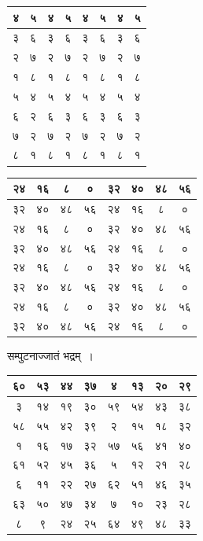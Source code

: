 \documentclass[11pt, openany]{book}
\begin{document}
\begin{table}[h]
	\centering
\setlength{\extrarowheight}{2pt} \setlength{\tabcolsep}{3pt}
	\begin{tabular}{|c|c|c|c|c|c|c|c|}
		\hline
		४& ५ & ४ & ५ & ४ & ५ & ४ & ५\\
		\hline
		३ & ६ & ३ & ६ & ३ & ६ & ३ & ६ \\
		\hline
		२& ७ & २ & ७ & २ & ७ & २& ७ \\
		\hline
		१ & ८ & १ & ८ & १ & ८ & १ &८ \\
		\hline
		५ & ४ & ५ & ४ & ५ & ४ &५ & ४\\
		\hline
		६ & २ & ६ & ३ & ६ & ३ & ६ & ३\\
		\hline
		७ & २ & ७ & २ & ७ & २ & ७ & २\\
		\hline
		८ & १ & ८ & १ & ८ & १ & ८ & १\\
		\hline
		\end{tabular}\qquad
	\begin{tabular}{|c|c|c|c|c|c|c|c|}
		\hline
		२४ & १६ & ८ & ० & ३२ & ४० & ४८ & ५६\\
		\hline
		३२ & ४० & ४८ & ५६ & २४ & १६ & ८ & ० \\
		\hline
		२४& १६ & ८ & ० & ३२ & ४० & ४८ & ५६\\ 
		\hline
		३२ & ४० & ४८ & ५६ &२४ & १६ & ८ & ० \\
		\hline
		२४ & १६ & ८ & ० & ३२& ४० & ४८ & ५६\\
		\hline
		३२ & ४० & ४८ & ५६ & २४ & १६ & ८& ० \\
		\hline
		२४ & १६ & ८ & ० & ३२ & ४० & ४८ & ५६\\
		\hline
		३२ & ४० & ४८ & ५६ & २४ & १६ & ८ & ०\\
		\hline
	\end{tabular}
\end{table}

\newpage

\begin{center}
 सम्पुटनाज्जातं भद्रम्~।	
\end{center}
\vspace{-4mm}

\begin{table}[h]
	\centering
\setlength{\extrarowheight}{2pt} \setlength{\tabcolsep}{2pt}	
\begin{tabular}{|c|c|c|c|c|c|c|c|}
	\hline
	६० & ५३ & ४४ & ३७ & ४ & १३ & २० & २९\\
	\hline
	३ & १४ & १९ & ३० & ५९ & ५४ & ४३ & ३८ \\
	\hline
	५८& ५५ & ४२ & ३९ & २ & १५ & १८ & ३२\\ 
	\hline
	१ & १६ & १७ & ३२ &५७ & ५६ & ४१ & ४० \\
	\hline
	६१& ५२ & ४५ & ३६ & ५& १२ & २१ & २८\\
	\hline
	६& ११ & २२ & २७ & ६२ & ५१ & ४६ & ३५ \\
	\hline
	६३& ५० & ४७ & ३४ & ७ & १० & २३ & २८\\
	\hline
	८ & ९ & २४ & २५ & ६४ & ४९ & ४८ & ३३\\
	\hline
\end{tabular}
\end{table}
\end{document}
